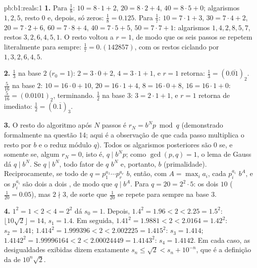 \begin{solution}{pb:b1:reals:1}
\textbf{1.} Para $\frac 18$: $10 = 8 \cdot 1 + 2$, $20 = 8 \cdot 2
+ 4$, $40 = 8 \cdot 5 + 0$; algarismos $1, 2, 5$, resto $0$ e, depois,
só zeros: $\frac 18 = 0.125$. Para $\frac 17$: $10 = 7 \cdot 1 +
3$, $30 = 7 \cdot 4 + 2$, $20 = 7 \cdot 2 + 6$, $60 = 7 \cdot 8 +
4$, $40 = 7 \cdot 5 + 5$, $50 = 7 \cdot 7 + 1$: algarismos $1, 4, 2,
8, 5, 7$, restos $3, 2, 6, 4, 5, 1$. O resto
voltou a $r = 1$, de modo que os seis passos se repetem literalmente
para sempre: $\frac 17 = 0.(142857)$, com os restos ciclando por $1, 3, 2, 6,
4, 5$.

\textbf{2.} $\frac 13$ na base $2$ ($r_0 = 1$): $2 = 3 \cdot 0 +
2$, $4 = 3 \cdot 1 + 1$, e $r = 1$ retorna: $\frac 13 =
(0.\overline{01})_2$. $\frac{5}{16}$ na base $2$: $10 = 16 \cdot
0 + 10$, $20 = 16 \cdot 1 + 4$, $8 = 16 \cdot 0 + 8$, $16 = 16
\cdot 1 + 0$: $\frac{5}{16} = (0.0101)_2$, terminando. $\frac 12$
na base $3$: $3 = 2 \cdot 1 + 1$, e $r = 1$ retorna de imediato:
$\frac 12 = (0.\overline{1})_3$.

\textbf{3.} O resto do algoritmo após $N$ passos é $r_N =
b^N p \bmod q$ (demonstrado formalmente na questão 14; aqui é a
observação de que cada passo multiplica o resto por $b$ e o
reduz módulo $q$). Todos os algarismos posteriores são $0$ se, e somente
se, algum $r_N = 0$, isto é, $q \mid b^N p$; como $\gcd(p, q) = 1$, o lema de
Gauss dá $q \mid b^N$. Se $q \mid b^N$, todo fator  de
$q$  $b^N$ e, portanto,  $b$ (primalidade). Reciprocamente,
se todo  de $q = p_1^{a_1} \cdots p_r^{a_r}$  $b$, então,
com $A = \max_i a_i$, cada $p_i^{a_i}$  $b^A$, e os
$p_i^{a_i}$ são dois a dois , de modo que $q \mid b^A$. Para $q = 20 =
2^2 \cdot 5$: os dois   $10$ ($\frac{1}{20} = 0.05$),
mas $2 \nmid 3$, de sorte que $\frac{1}{20}$ se repete para sempre na base $3$.

\textbf{4.} $1^2 = 1 < 2 < 4 = 2^2$ dá $s_0 = 1$. Depois, $1.4^2
= 1.96 < 2 < 2.25 = 1.5^2$: $\lfloor 10\sqrt 2 \rfloor = 14$,
$s_1 = 1.4$. Em seguida, $1.41^2 = 1.9881 < 2 < 2.0164 = 1.42^2$: $s_2 =
1.41$; $1.414^2 = 1.999396 < 2 < 2.002225 = 1.415^2$: $s_3 =
1.414$; $1.4142^2 = 1.99996164 < 2 < 2.00024449 = 1.4143^2$: $s_4
= 1.4142$. Em cada caso, as desigualdades exibidas dizem exatamente
$s_n \leq \sqrt 2 < s_n + 10^{-n}$, que é a definição da
 de $10^n \sqrt 2$.


\end{solution}
